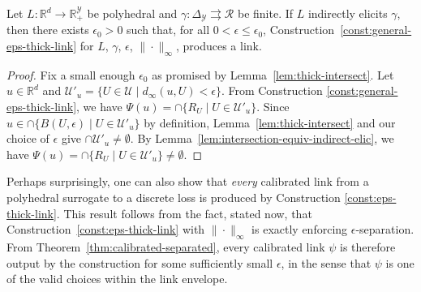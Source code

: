 \documentclass[twoside,11pt]{article}
\newcommand{\reals}{\mathbb{R}}
\newcommand{\simplex}{\Delta_\Y}
\newcommand{\R}{\mathcal{R}}
\newcommand{\U}{\mathcal{U}}
\newcommand{\Y}{\mathcal{Y}}
\newcommand{\toto}{\rightrightarrows}
\begin{document}
\begin{proposition}\label{prop:general-eps-thick-produce}
  Let $L:\reals^d\to\reals^\Y_+$ be polyhedral and $\gamma:\simplex\toto\R$ be finite.
  If $L$ indirectly elicits $\gamma$, then there exists $\epsilon_0 > 0$ such that, for all $0 < \epsilon \leq \epsilon_0$, Construction~\ref{const:general-eps-thick-link} for $L$, $\gamma$, $\epsilon$, $\|\cdot\|_\infty$, produces a link.
\end{proposition}
\begin{proof}
  Fix a small enough $\epsilon_0$ as promised by Lemma~\ref{lem:thick-intersect}.
  Let $u\in\reals^d$ and $\U'_u = \{U\in\U \mid d_\infty(u,U) < \epsilon\}$.
  From Construction \ref{const:general-eps-thick-link}, we have $\Psi(u) = \cap \{R_U \mid U\in\U'_u\}$.
  Since $u\in\cap\{B(U,\epsilon) \mid U\in\U'_u\} $ by definition, Lemma~\ref{lem:thick-intersect} and our choice of $\epsilon$ give $\cap\U'_u \neq \emptyset$.
  By Lemma~\ref{lem:intersection-equiv-indirect-elic}, we have $\Psi(u) = \cap \{R_U \mid U\in\U'_u\} \neq \emptyset$.
\end{proof}


Perhaps surprisingly, one can also show that \emph{every} calibrated link from a polyhedral surrogate to a discrete loss is produced by Construction \ref{const:eps-thick-link}.
This result follows from the fact, stated now, that Construction~\ref{const:eps-thick-link} with $\|\cdot\|_\infty$ is exactly enforcing $\epsilon$-separation.
From Theorem~\ref{thm:calibrated-separated}, every calibrated link $\psi$ is therefore output by the construction for some sufficiently small $\epsilon$, in the sense that $\psi$ is one of the valid choices within the link envelope.
\end{document}
